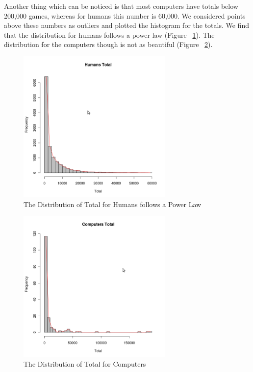 \documentclass{article}
\begin{document}
Another thing which can be noticed is that most computers have totals below 200,000 games, whereas for humans this number is 60,000. We considered points above these numbers as outliers and plotted the histogram for the totals. We find that the distribution for humans follows a power law (Figure ~\ref{fig:humanstotal}). The distribution for the computers though is not as beautiful (Figure ~\ref{fig:compstotal}).\\

\begin{figure} [htp]
\begin{center}
\includegraphics[width=3in]{humans_total.png}
\end{center}
\caption{The Distribution of Total for Humans follows a Power Law}
\label{fig:humanstotal}
\end{figure}

\begin{figure} [htp]
\begin{center}
\includegraphics[width=3in]{computers_total.png}
\end{center}
\caption{The Distribution of Total for Computers}
\label{fig:compstotal}
\end{figure}
\end{document}
